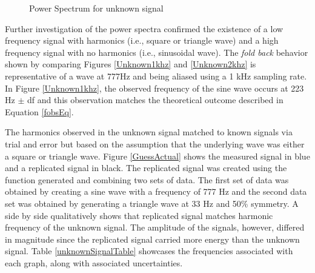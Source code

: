 \documentclass[letterpaper,12pt]{article}
\begin{document}
\begin{figure}[ht]
\centering
{}
\quad
{}
\caption{Power Spectrum for unknown signal}
\label{UnknownSignalFigures}
\end{figure}

 Further investigation of the power spectra confirmed the existence of a low frequency signal with harmonics (i.e., square or triangle wave) and a high frequency signal with no harmonics (i.e., sinusoidal wave). The \emph{fold back} behavior shown by comparing Figures \ref{Unknown1khz} and \ref{Unknown2khz} is representative of a wave at 777Hz and being aliased using a 1 kHz sampling rate. In Figure \ref{Unknown1khz}, the observed frequency of the sine wave occurs at 223 Hz $\pm$ df and this observation matches the theoretical outcome described in Equation \ref{fobsEq}.

The harmonics observed in the unknown signal matched to known signals via trial and error but based on the assumption that the underlying wave was either a square or triangle wave. Figure \ref{GuessActual} shows the measured signal in blue and a replicated signal in black. The replicated signal was created using the function generated and combining two sets of data. The first set of data was obtained by creating a sine wave with a frequency of 777 Hz and the second data set was obtained by generating a triangle wave at 33 Hz and 50\% symmetry. A side by side qualitatively shows that replicated signal matches harmonic frequency of the unknown signal. The amplitude of the signals, however, differed in magnitude since the replicated signal carried more energy than the unknown signal. Table \ref{unknownSignalTable} showcases the frequencies associated with each graph, along with associated uncertainties.
\end{document}
